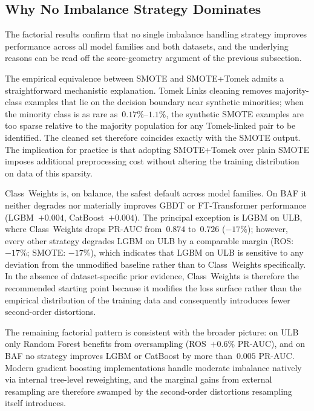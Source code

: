 \documentclass[a4paper,fleqn]{cas-sc}
\begin{document}
\subsection{Why No Imbalance Strategy Dominates}
\label{subsec:disc_strategy}

The factorial results confirm that no single imbalance handling strategy improves
performance across all model families and both datasets, and the underlying reasons
can be read off the score-geometry argument of the previous subsection.

The empirical equivalence between SMOTE and SMOTE+Tomek admits a straightforward
mechanistic explanation. Tomek Links cleaning removes majority-class examples that lie
on the decision boundary near synthetic minorities; when the minority class is as rare
as~$0.17\%$--$1.1\%$, the synthetic SMOTE examples are too sparse relative to the
majority population for any Tomek-linked pair to be identified. The cleaned set therefore
coincides exactly with the SMOTE output. The implication for practice is that adopting
SMOTE+Tomek over plain SMOTE imposes additional preprocessing cost without altering the
training distribution on data of this sparsity.

Class~Weights is, on balance, the safest default across model families. On BAF it
neither degrades nor materially improves GBDT or FT-Transformer performance
(LGBM~$+0.004$, CatBoost~$+0.004$). The principal exception is LGBM on ULB, where
Class~Weights drops PR-AUC from~$0.874$ to~$0.726$ ($-17\%$); however, every other
strategy degrades LGBM on ULB by a comparable margin (ROS: $-17\%$; SMOTE: $-17\%$),
which indicates that LGBM on ULB is sensitive to any deviation from the unmodified
baseline rather than to Class~Weights specifically. In the absence of dataset-specific
prior evidence, Class~Weights is therefore the recommended starting point because it
modifies the loss surface rather than the empirical distribution of the training data
and consequently introduces fewer second-order distortions.

The remaining factorial pattern is consistent with the broader picture: on ULB only
Random Forest benefits from oversampling (ROS~$+0.6\%$ PR-AUC), and on BAF no strategy
improves LGBM or CatBoost by more than~$0.005$ PR-AUC. Modern gradient boosting
implementations handle moderate imbalance natively via internal tree-level reweighting,
and the marginal gains from external resampling are therefore swamped by the second-order
distortions resampling itself introduces.
\end{document}
